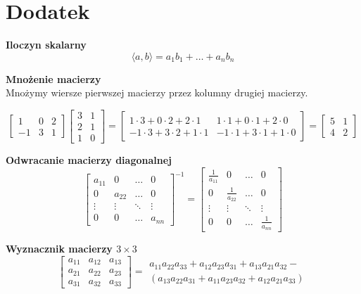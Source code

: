 \documentclass[../mn-notatki.tex]{subfiles}
\begin{document}
\section{Dodatek}

\begin{tcolorbox}
\textbf{Iloczyn skalarny}
\[
\langle a, b \rangle = a_1 b_1 + \ldots + a_n b_n
\]
\end{tcolorbox}


\begin{tcolorbox}
\textbf{Mnożenie macierzy}\\
Mnożymy wiersze pierwszej macierzy przez kolumny drugiej macierzy.

\[
{\begin{bmatrix}1&0&2\\-1&3&1\end{bmatrix}} {\begin{bmatrix}3&1\\2&1\\1&0\end{bmatrix}}=
{\begin{bmatrix}1\cdot 3+0\cdot 2+2\cdot 1&1\cdot 1+0\cdot 1+2\cdot 0\\
-1\cdot 3+3\cdot 2+1\cdot 1&-1\cdot 1+3\cdot 1+1\cdot 0\end{bmatrix}}=
{\begin{bmatrix}5&1\\4&2\end{bmatrix}}
\]
\end{tcolorbox}

\begin{tcolorbox}
\textbf{Odwracanie macierzy diagonalnej}
\[
\begin{bmatrix}
a_{11} & 0 & \ldots & 0\\
0 & a_{22} & \ldots & 0\\
\vdots & \vdots & \ddots & \vdots\\
0 & 0 & \ldots & a_{nn}
\end{bmatrix}^{-1}
=
\begin{bmatrix}
\frac{1}{a_{11}} & 0 & \ldots & 0\\
0 & \frac{1}{a_{22}} & \ldots & 0\\
\vdots & \vdots & \ddots & \vdots\\
0 & 0 & \ldots & \frac{1}{a_{nn}}
\end{bmatrix}
\]
\end{tcolorbox}

\begin{tcolorbox}
\textbf{Wyznacznik macierzy $3 \times 3$}
\[
\begin{bmatrix}
a_{11} & a_{12} & a_{13}\\
a_{21} & a_{22} & a_{23}\\
a_{31} & a_{32} & a_{33}
\end{bmatrix}
=
\substack{a_{11}a_{22}a_{33}+a_{12}a_{23}a_{31}+a_{13}a_{21}a_{32}-\\
(a_{13}a_{22}a_{31}+a_{11}a_{23}a_{32}+a_{12}a_{21}a_{33})
}
\]
\end{tcolorbox}

\pagebreak
\end{document}
